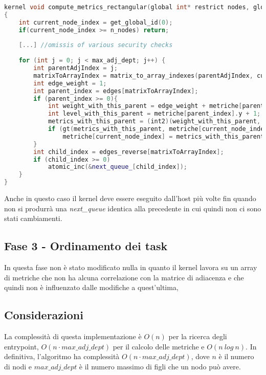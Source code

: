 \documentclass[../relazione.tex]{subfiles}
\begin{document}
\begin{lstlisting}[language=C++, caption={Compute metrics kernel II},captionpos=b]
kernel void compute_metrics_rectangular(global int* restrict nodes, global int* queue_, global int* next_queue_, const int n_nodes, global edge_t* restrict edges, global edge_t* restrict edges_reverse, volatile global int2* metriche, const int max_adj_dept)
{
	int current_node_index = get_global_id(0);
	if(current_node_index >= n_nodes) return;
	
	[...] //omissis of various security checks
	
	for (int j = 0; j < max_adj_dept; j++) {
		int parentAdjIndex = j;
		matrixToArrayIndex = matrix_to_array_indexes(parentAdjIndex, current_node_index, n_nodes);
		int edge_weight = 1;
		int parent_index = edges[matrixToArrayIndex];
		if (parent_index >= 0){
			int weight_with_this_parent = edge_weight + metriche[parent_index].x + nodes[current_node_index];
			int level_with_this_parent = metriche[parent_index].y + 1;
			metrics_with_this_parent = (int2)(weight_with_this_parent, level_with_this_parent);
			if (gt(metrics_with_this_parent, metriche[current_node_index]))
				metriche[current_node_index] = metrics_with_this_parent;
		}
		int child_index = edges_reverse[matrixToArrayIndex];
		if (child_index >= 0)
			atomic_inc(&next_queue_[child_index]);
	}
}
\end{lstlisting}

Anche in questo caso il kernel deve essere eseguito dall'host più volte fin quando non si produrrà una \textit{next\_queue} identica alla precedente in cui quindi non ci sono stati cambiamenti.

\subsection{Fase 3 - Ordinamento dei task}
In questa fase non è stato modificato nulla in quanto il kernel lavora su un array di metriche che non ha alcuna correlazione con la matrice di adiacenza e che quindi non è influenzato dalle modifiche a quest'ultima,

\subsection{Considerazioni}
La complessità di questa implementazione è $O(n)$ per la ricerca degli entrypoint, $O(n \cdot max\_adj\_dept)$ per il calcolo delle metriche e $O(n\ log\ n)$.
In definitiva, l'algoritmo ha complessità $O(n \cdot max\_adj\_dept)$, dove $n$ è il numero di nodi e $max\_adj\_dept$ è il numero massimo di figli che un nodo può avere.
\end{document}
